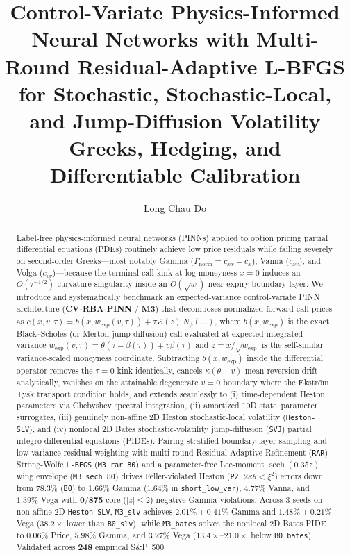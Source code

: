 \documentclass[preprint,12pt]{elsarticle}
\begin{document}
\begin{frontmatter}

\title{Control-Variate Physics-Informed Neural Networks with Multi-Round Residual-Adaptive L-BFGS for Stochastic, Stochastic-Local, and Jump-Diffusion Volatility Greeks, Hedging, and Differentiable Calibration}

\author[inst1]{Long Chau Do}
\address[inst1]{Quantitative Finance and Scientific Machine Learning Research}

\begin{abstract}
Label-free physics-informed neural networks (PINNs) applied to option pricing partial differential equations (PDEs) routinely achieve low price residuals while failing severely on second-order Greeks---most notably Gamma ($\Gamma_{\mathrm{norm}} = c_{xx} - c_x$), Vanna ($c_{xv}$), and Volga ($c_{vv}$)---because the terminal call kink at log-moneyness $x = 0$ induces an $O(\tau^{-1/2})$ curvature singularity inside an $O(\sqrt{w})$ near-expiry boundary layer. We introduce and systematically benchmark an expected-variance control-variate PINN architecture (\textbf{CV-RBA-PINN} / \textbf{M3}) that decomposes normalized forward call prices as $c(x, v, \tau) = b(x, w_{\mathrm{exp}}(v, \tau)) + \tau\,\mathcal{E}(z)\,N_\phi(\dots)$, where $b(x, w_{\mathrm{exp}})$ is the exact Black--Scholes (or Merton jump-diffusion) call evaluated at expected integrated variance $w_{\mathrm{exp}}(v, \tau) = \theta(\tau - \beta(\tau)) + v\beta(\tau)$ and $z = x/\sqrt{w_{\mathrm{exp}}}$ is the self-similar variance-scaled moneyness coordinate. Subtracting $b(x, w_{\mathrm{exp}})$ inside the differential operator removes the $\tau = 0$ kink identically, cancels $\kappa(\theta - v)$ mean-reversion drift analytically, vanishes on the attainable degenerate $v = 0$ boundary where the Ekstr\"om--Tysk transport condition holds, and extends seamlessly to (i) time-dependent Heston parameters via Chebyshev spectral integration, (ii) amortized 10D state--parameter surrogates, (iii) genuinely non-affine 2D Heston stochastic-local volatility (\texttt{Heston-SLV}), and (iv) nonlocal 2D Bates stochastic-volatility jump-diffusion (\texttt{SVJ}) partial integro-differential equations (PIDEs). Pairing stratified boundary-layer sampling and low-variance residual weighting with multi-round Residual-Adaptive Refinement (\texttt{RAR}) Strong-Wolfe \texttt{L-BFGS} (\texttt{M3\_rar\_80}) and a parameter-free Lee-moment $\operatorname{sech}(0.35 z)$ wing envelope (\texttt{M3\_sech\_80}) drives Feller-violated Heston (\texttt{P2}, $2\kappa\theta < \xi^2$) errors down from $78.3\%$ (\texttt{B0}) to $\mathbf{1.66\%}$ Gamma ($1.64\%$ in \texttt{short\_low\_var}), $\mathbf{4.77\%}$ Vanna, and $\mathbf{1.39\%}$ Vega with $\mathbf{0/875}$ core ($|z|\le 2$) negative-Gamma violations. Across 3 seeds on non-affine 2D \texttt{Heston-SLV}, \texttt{M3\_slv} achieves $\mathbf{2.01\% \pm 0.41\%}$ Gamma and $\mathbf{1.48\% \pm 0.21\%}$ Vega ($38.2\times$ lower than \texttt{B0\_slv}), while \texttt{M3\_bates} solves the nonlocal 2D Bates PIDE to $\mathbf{0.06\%}$ Price, $\mathbf{5.98\%}$ Gamma, and $\mathbf{3.27\%}$ Vega ($13.4\times\text{--}21.0\times$ below \texttt{B0\_bates}). Validated across $\mathbf{248}$ empirical S\&P~500 
\end{abstract}
\end{frontmatter}
\end{document}
